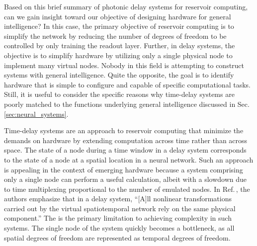 Based on this brief summary of photonic delay systems for reservoir computing, can we gain insight toward our objective of designing hardware for general intelligence? In this case, the primary objective of reservoir computing is to simplify the network by reducing the number of degrees of freedom to be controlled by only training the readout layer. Further, in delay systems, the objective is to simplify hardware by utilizing only a single physical node to implement many virtual nodes. Nobody in this field is attempting to construct systems with general intelligence. Quite the opposite, the goal is to identify hardware that is simple to configure and capable of specific computational tasks. Still, it is useful to consider the specific reasons why time-delay systems are poorly matched to the functions underlying general intelligence discussed in Sec.\,\ref{sec:neural_systems}.

Time-delay systems are an approach to reservoir computing that minimize the demands on hardware by extending computation across time rather than across space. The state of a node during a time window in a delay system corresponds to the state of a node at a spatial location in a neural network. Such an approach is appealing in the context of emerging hardware because a system comprising only a single node can perform a useful calculation, albeit with a slowdown due to time multiplexing proportional to the number of emulated nodes. In Ref.\,\cite{brpe2018}, the authors emphasize that in a delay system, ``[A]ll nonlinear transformations carried out by the virtual spatiotemporal network rely on the same physical component.'' The is the primary limitation to achieving complexity in such systems. The single node of the system quickly becomes a bottleneck, as all spatial degrees of freedom are represented as temporal degrees of freedom. 

